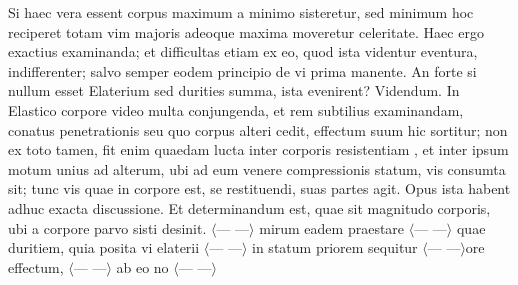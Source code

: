 Si haec vera essent corpus maximum a minimo sisteretur,
sed minimum hoc reciperet totam vim majoris adeoque maxima moveretur celeritate\protect{}.
Haec ergo exactius examinanda;
et difficultas etiam ex eo, quod ista videntur eventura, indifferenter;
salvo semper eodem principio de vi prima manente.
An forte si nullum esset Elaterium\protect{} sed durities\protect{} summa,
ista evenirent? Videndum.
\pend
\pstart
In Elastico corpore\protect{} video multa conjungenda,
et rem subtilius examinandam,
conatus penetrationis\protect{} seu quo corpus alteri cedit,
effectum\protect{} suum hic sortitur;
non ex toto tamen,
fit enim quaedam lucta inter corporis resistentiam\protect{}
,
et inter ipsum motum unius ad alterum,
ubi ad eum venere compressionis\protect{} statum,
vis consumta sit;
tunc vis quae in corpore est, se restituendi, suas partes agit.
Opus ista habent adhuc exacta discussione.
Et determinandum est,
quae sit magnitudo corporis\protect{},
ubi a corpore parvo sisti desinit.
\pend
\vspace*{2em}
\pstart
{}
\pend
\vspace*{0.5em}
\pstart
\noindent
$\displaystyle\langle$--- ---$\displaystyle\rangle$ mirum eadem praestare
$\displaystyle\langle$--- ---$\displaystyle\rangle$ quae duritiem\protect{}, quia posita vi elaterii\protect{}
$\displaystyle\langle$--- ---$\displaystyle\rangle$ in statum priorem sequitur
$\displaystyle\langle$--- ---$\displaystyle\rangle$ore effectum\protect{},
$\displaystyle\langle$--- ---$\displaystyle\rangle$ ab eo no%
$\displaystyle\langle$--- ---$\displaystyle\rangle$
\pend